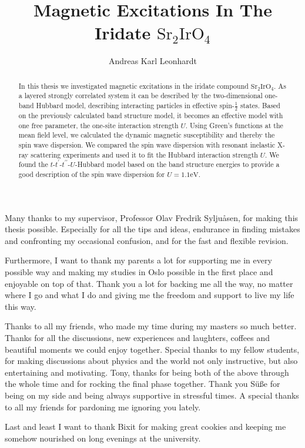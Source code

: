 \documentclass[a4paper,12pt]{uiofysmaster}
\title{Magnetic Excitations In The Iridate $\mathrm{Sr}_2\mathrm{IrO}_4$}
\author{Andreas Karl Leonhardt}
\newcommand{\Sriro}{$\mathrm{Sr}_2\mathrm{Ir}\mathrm{O}_4$\:}
\begin{document}

\cleardoublepage

\begin{abstract}
In this thesis we investigated magnetic excitations in the iridate compound \Sriro.
As a layered strongly correlated system it can be described by the two-dimensional one-band Hubbard model, 
describing interacting particles in effective spin-$\frac12$ states.
Based on the previously calculated band structure model, it becomes an effective model with one free parameter, the one-site interaction strength $U$.
Using Green's functions at the mean field level, we calculated the dynamic magnetic susceptibility
and thereby the spin wave dispersion.
We compared the spin wave dispersion with resonant inelastic X-ray scattering experiments and used it to fit the Hubbard interaction strength $U$. 
We found the $t$-$t^{\prime}$-$t^{\prime\prime}$-$U$-Hubbard model based on the band structure energies
to provide a good description of the spin wave dispersion for $U=1.1\mathrm{eV}$. 
\end{abstract}


\begin{acknowledgements}
 Many thanks to my supervisor, Professor Olav Fredrik Syljuåsen, for making this thesis possible.
 Especially for all the tips and ideas, endurance in finding mistakes and confronting my occasional confusion, and for the fast and flexible revision.

 Furthermore, I want to thank my parents a lot for supporting me in every possible way and making my studies in Oslo possible in the first place and enjoyable on top of that.
 Thank you a lot for backing me all the way, no matter where I go and what I do and giving me the freedom and support to live my life this way. 
 
 Thanks to all my friends, who made my time during my masters so much better. 
 Thanks for all the discussions, new experiences and laughters, coffees and beautiful moments we could enjoy together.
 Special thanks to my fellow students, for making discussions about physics and the world  not only instructive, but also entertaining and motivating.
 Tony, thanks for being both of the above through the whole time and for rocking the final phase together. 
 Thank you Süße for being on my side and being always supportive in stressful times. 
 A special thanks to all my friends for pardoning me ignoring you lately.
 
 Last and least I want to thank Bixit for making great cookies and keeping me somehow nourished on long evenings at the university. 
 
\end{acknowledgements}
\end{document}
